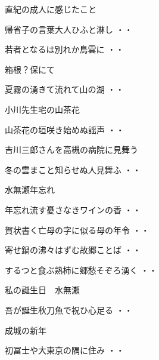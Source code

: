 \vspace{ 0.4cm}
直紀の成人に感じたこと
\begin{shiika}帰省子の言葉大人ひふと淋し
\hfill{・・}\end{shiika}
\begin{shiika}若者となるは別れか鳥雲に
\hfill{・・}\end{shiika}
\vspace{ 0.4cm}
箱根？保にて
\begin{shiika}夏霧の湧きて流れて山の湖
\hfill{・・}\end{shiika}
\vspace{ 0.4cm}
小川先生宅の山茶花
\begin{shiika}山茶花の垣咲き始めぬ謡声
\hfill{・・}\end{shiika}
\vspace{ 0.4cm}
吉川三郎さんを高槻の病院に見舞う
\begin{shiika}冬の雲まこと知らせぬ人見舞ふ
\hfill{・・}\end{shiika}
\vspace{ 0.4cm}
水無瀬年忘れ
\begin{shiika}年忘れ流す憂さなきワインの香
\hfill{・・}\end{shiika}
\begin{shiika}賀状書く亡母の字に似る母の年令
\hfill{・・}\end{shiika}
\begin{shiika}寄せ鍋の沸々はずむ故郷ことば
\hfill{・・}\end{shiika}
\begin{shiika}するつと食ぶ熟柿に郷愁そぞろ湧く
\hfill{・・}\end{shiika}
\vspace{ 0.4cm}
私の誕生日　水無瀬
\begin{shiika}吾が誕生秋刀魚で祝ひ心足る
\hfill{・・}\end{shiika}
\vspace{ 0.4cm}
成城の新年
\begin{shiika}初冨士や大東京の隅に住み
\hfill{・・}\end{shiika}
\vspace{ 0.4cm}
